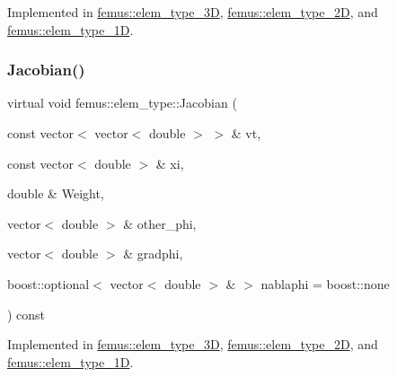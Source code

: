 Implemented in \mbox{\hyperlink{classfemus_1_1elem__type__3_d_a277615099e6e69b4aed9e1cd9e84817d}{femus\+::elem\+\_\+type\+\_\+3D}}, \mbox{\hyperlink{classfemus_1_1elem__type__2_d_ab63098a94dbccfc4808881b61fc9ab81}{femus\+::elem\+\_\+type\+\_\+2D}}, and \mbox{\hyperlink{classfemus_1_1elem__type__1_d_a6209ff2d3d1b74ac6f1ee1eb9140908e}{femus\+::elem\+\_\+type\+\_\+1D}}.

\mbox{\label{classfemus_1_1elem__type_aab6db5851a9810adfe0ff98df2c30810}} 
\subsubsection{\texorpdfstring{Jacobian()}{Jacobian()}\hspace{0.1cm}{\footnotesize\ttfamily [4/4]}}
{\footnotesize\ttfamily virtual void femus\+::elem\+\_\+type\+::\+Jacobian (\begin{DoxyParamCaption}\item[{const vector$<$ vector$<$ double $>$ $>$ \&}]{vt,  }\item[{const vector$<$ double $>$ \&}]{xi,  }\item[{double \&}]{Weight,  }\item[{vector$<$ double $>$ \&}]{other\+\_\+phi,  }\item[{vector$<$ double $>$ \&}]{gradphi,  }\item[{boost\+::optional$<$ vector$<$ double $>$ \& $>$}]{nablaphi = {\ttfamily boost\+:\+:none} }\end{DoxyParamCaption}) const\hspace{0.3cm}{\ttfamily [pure virtual]}}



Implemented in \mbox{\hyperlink{classfemus_1_1elem__type__3_d_a53f0fe22a3df82bab547a2578d66d7c6}{femus\+::elem\+\_\+type\+\_\+3D}}, \mbox{\hyperlink{classfemus_1_1elem__type__2_d_a0194ae2956bdb2aaf843e05477ac3684}{femus\+::elem\+\_\+type\+\_\+2D}}, and \mbox{\hyperlink{classfemus_1_1elem__type__1_d_ac6814828a90c49fd5b29df4b5d161653}{femus\+::elem\+\_\+type\+\_\+1D}}.

\mbox{\label{classfemus_1_1elem__type_a293052fac0f51472150b1bf7365c6b18}} 

